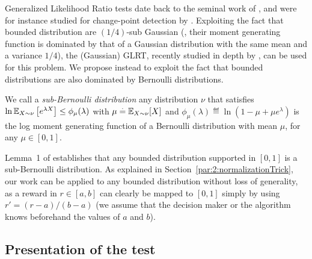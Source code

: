 Generalized Likelihood Ratio tests date back to the seminal work of \cite{Wilks1938}, and were for instance studied for change-point detection by \cite{barnard1959control,siegmund1995using}.
Exploiting the fact that bounded distribution are $(1/4)$-sub Gaussian (\ie, their moment generating function is dominated by that of a Gaussian distribution with the same mean and a variance $1/4$), the (Gaussian) GLRT, recently studied in depth by \cite{Maillard2018GLR}, can be used for this problem.
We propose instead to exploit the fact that bounded distributions are also dominated by Bernoulli distributions.

\begin{definition}\label{def:6:subBernoulliDistributions}
\begin{leftbar}[defnbar]  %
    We call a \emph{sub-Bernoulli distribution} any distribution $\nu$ that satisfies
    $\ln \mathbb{E}_{X\sim\nu}\left[e^{\lambda X}\right] \leq \phi_{\mu}(\lambda)$ with $\mu \overset{.}{=} \mathbb{E}_{X\sim \nu}[X]$ and $\phi_{\mu}(\lambda) \eqdef \ln(1-\mu + \mu e^\lambda)$ is the log moment generating function of a Bernoulli distribution with mean $\mu$, for any $\mu\in[0,1]$.
\end{leftbar}  %
\end{definition}

Lemma~1 of \cite{KLUCBJournal} establishes that any bounded distribution supported in $[0,1]$ is a sub-Bernoulli distribution.
As explained in Section~\ref{par:2:normalizationTrick}, our work can be applied to any bounded distribution without loss of generality, as a reward in $r\in[a,b]$ can clearly be mapped to $[0,1]$ simply by using $r' = (r-a)/(b-a)$ (we assume that the decision maker or the algorithm knows beforehand the values of $a$ and $b$).


\subsection{Presentation of the test}\label{sub:6:presentationOfGLRTest}

